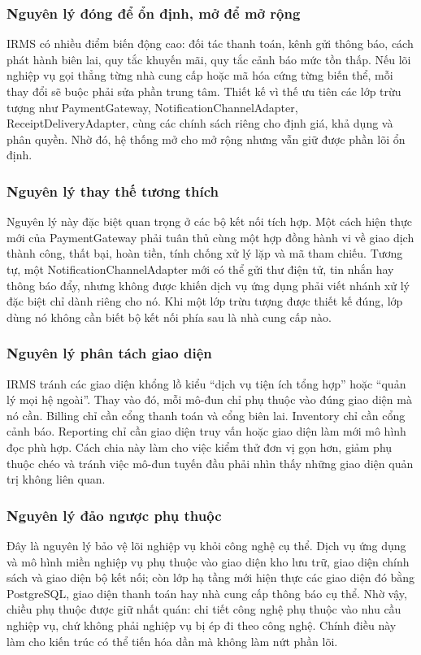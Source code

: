 \documentclass[11pt,a4paper]{article}
\begin{document}
\subsubsection{Nguyên lý đóng để ổn định, mở để mở rộng}
IRMS có nhiều điểm biến động cao: đối tác thanh toán, kênh gửi thông báo, cách phát hành biên lai, quy tắc khuyến mãi, quy tắc cảnh báo mức tồn thấp. Nếu lõi nghiệp vụ gọi thẳng từng nhà cung cấp hoặc mã hóa cứng từng biến thể, mỗi thay đổi sẽ buộc phải sửa phần trung tâm. Thiết kế vì thế ưu tiên các lớp trừu tượng như \textsf{PaymentGateway}, \textsf{NotificationChannelAdapter}, \textsf{ReceiptDeliveryAdapter}, cùng các chính sách riêng cho định giá, khả dụng và phân quyền. Nhờ đó, hệ thống mở cho mở rộng nhưng vẫn giữ được phần lõi ổn định.

\subsubsection{Nguyên lý thay thế tương thích}
Nguyên lý này đặc biệt quan trọng ở các bộ kết nối tích hợp. Một cách hiện thực mới của \textsf{PaymentGateway} phải tuân thủ cùng một hợp đồng hành vi về giao dịch thành công, thất bại, hoàn tiền, tính chống xử lý lặp và mã tham chiếu. Tương tự, một \textsf{NotificationChannelAdapter} mới có thể gửi thư điện tử, tin nhắn hay thông báo đẩy, nhưng không được khiến dịch vụ ứng dụng phải viết nhánh xử lý đặc biệt chỉ dành riêng cho nó. Khi một lớp trừu tượng được thiết kế đúng, lớp dùng nó không cần biết bộ kết nối phía sau là nhà cung cấp nào.

\subsubsection{Nguyên lý phân tách giao diện}
IRMS tránh các giao diện khổng lồ kiểu \enquote{dịch vụ tiện ích tổng hợp} hoặc \enquote{quản lý mọi hệ ngoài}. Thay vào đó, mỗi mô-đun chỉ phụ thuộc vào đúng giao diện mà nó cần. \textsf{Billing} chỉ cần cổng thanh toán và cổng biên lai. \textsf{Inventory} chỉ cần cổng cảnh báo. \textsf{Reporting} chỉ cần giao diện truy vấn hoặc giao diện làm mới mô hình đọc phù hợp. Cách chia này làm cho việc kiểm thử đơn vị gọn hơn, giảm phụ thuộc chéo và tránh việc mô-đun tuyến đầu phải nhìn thấy những giao diện quản trị không liên quan.

\subsubsection{Nguyên lý đảo ngược phụ thuộc}
Đây là nguyên lý bảo vệ lõi nghiệp vụ khỏi công nghệ cụ thể. Dịch vụ ứng dụng và mô hình miền nghiệp vụ phụ thuộc vào giao diện kho lưu trữ, giao diện chính sách và giao diện bộ kết nối; còn lớp hạ tầng mới hiện thực các giao diện đó bằng \textsf{PostgreSQL}, giao diện thanh toán hay nhà cung cấp thông báo cụ thể. Nhờ vậy, chiều phụ thuộc được giữ nhất quán: chi tiết công nghệ phụ thuộc vào nhu cầu nghiệp vụ, chứ không phải nghiệp vụ bị ép đi theo công nghệ. Chính điều này làm cho kiến trúc có thể tiến hóa dần mà không làm nứt phần lõi.
\end{document}
